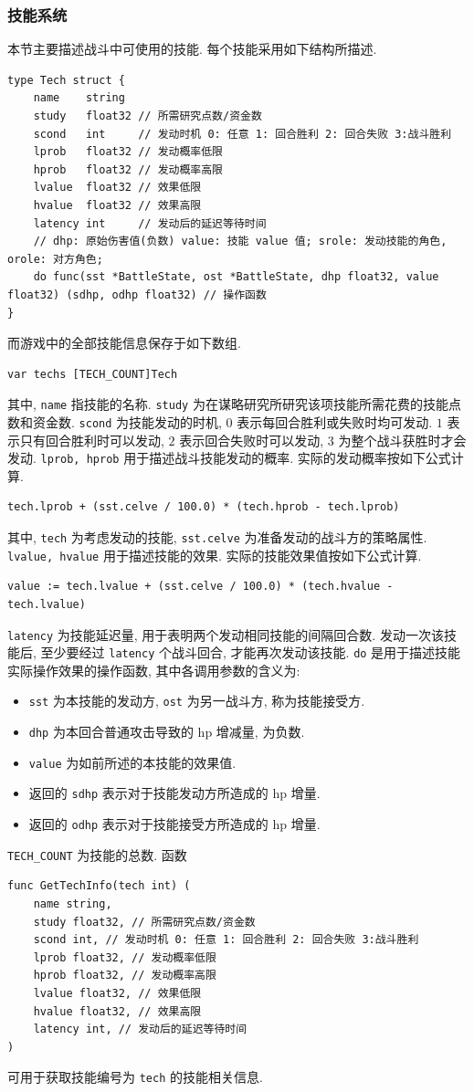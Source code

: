 \documentclass[UTF8, zihao=-4]{ctexart} %
\newcommand{\lcode}{\lstinline} % 段内插入代码
\begin{document}
\subsubsection{技能系统}
\label{s_battle_tech}
本节主要描述战斗中可使用的技能. 每个技能采用如下结构所描述.
\begin{lstlisting}
type Tech struct {
	name    string
	study   float32 // 所需研究点数/资金数
	scond   int     // 发动时机 0: 任意 1: 回合胜利 2: 回合失败 3:战斗胜利
	lprob   float32 // 发动概率低限
	hprob   float32 // 发动概率高限
	lvalue  float32 // 效果低限
	hvalue  float32 // 效果高限
	latency int     // 发动后的延迟等待时间
    // dhp: 原始伤害值(负数) value: 技能 value 值; srole: 发动技能的角色, orole: 对方角色;
	do func(sst *BattleState, ost *BattleState, dhp float32, value float32) (sdhp, odhp float32) // 操作函数
}
\end{lstlisting}
而游戏中的全部技能信息保存于如下数组.
\begin{lstlisting}
var techs [TECH_COUNT]Tech
\end{lstlisting}
其中, \lcode{name} 指技能的名称. 
\lcode{study} 为在谋略研究所研究该项技能所需花费的技能点数和资金数.
\lcode{scond} 为技能发动的时机, $0$ 表示每回合胜利或失败时均可发动.
$1$ 表示只有回合胜利时可以发动, $2$ 表示回合失败时可以发动,
$3$ 为整个战斗获胜时才会发动.
\lcode{lprob, hprob} 用于描述战斗技能发动的概率. 实际的发动概率按如下公式计算.
\begin{lstlisting}
tech.lprob + (sst.celve / 100.0) * (tech.hprob - tech.lprob)
\end{lstlisting}
其中, \lcode{tech} 为考虑发动的技能, \lcode{sst.celve} 为准备发动的战斗方的策略属性.
\lcode{lvalue, hvalue} 用于描述技能的效果. 实际的技能效果值按如下公式计算.
\begin{lstlisting}
value := tech.lvalue + (sst.celve / 100.0) * (tech.hvalue - tech.lvalue)
\end{lstlisting}
\lcode{latency} 为技能延迟量, 用于表明两个发动相同技能的间隔回合数. 
发动一次该技能后, 至少要经过 \lcode{latency} 个战斗回合, 才能再次发动该技能.
\lcode{do} 是用于描述技能实际操作效果的操作函数, 其中各调用参数的含义为:  
\begin{itemize}
    \item \lcode{sst} 为本技能的发动方, \lcode{ost} 为另一战斗方, 称为技能接受方.
    \item \lcode{dhp} 为本回合普通攻击导致的 hp 增减量, 为负数.
    \item \lcode{value} 为如前所述的本技能的效果值.
    \item 返回的 \lcode{sdhp} 表示对于技能发动方所造成的 hp 增量.
    \item 返回的 \lcode{odhp} 表示对于技能接受方所造成的 hp 增量.
\end{itemize}
\lcode{TECH_COUNT} 为技能的总数. 函数
\begin{lstlisting}
func GetTechInfo(tech int) (
	name string,
	study float32, // 所需研究点数/资金数
	scond int, // 发动时机 0: 任意 1: 回合胜利 2: 回合失败 3:战斗胜利
	lprob float32, // 发动概率低限
	hprob float32, // 发动概率高限
	lvalue float32, // 效果低限
	hvalue float32, // 效果高限
	latency int, // 发动后的延迟等待时间
) 
\end{lstlisting}
可用于获取技能编号为 \lcode{tech} 的技能相关信息.
\end{document}
